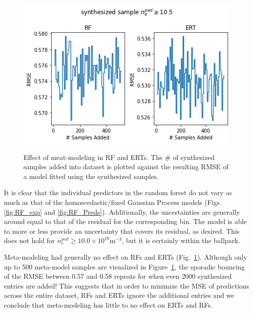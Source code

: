 \documentclass[a4paper, twoside, final, 12pt]{article}
\begin{document}
{\begin{figure}
		\centering
		\vspace{-18pt}
		\caption{Effect of meat-modeling in RF and ERTs. The \# of synthesized samples added into dataset is plotted against the resulting RMSE of a model fitted using the synthesized samples.}
		\includegraphics[width=\linewidth, keepaspectratio=true, trim=0 0 0 30, clip]{./src/ERT_vs_RF_meta_modeling}
		\vspace{-22pt}
		\label{fig:RF_meta_model}
\end{figure}
It is clear that the individual predictors in the random forest do not vary as much as that of the homoscedastic/fixed Gaussian Process models (Figs. \ref{fig:RF_exp} and \ref{fig:RF_Preds}).
Additionally, the uncertainties are generally around equal to that of the residual for the corresponding bin. The model is able to more or less provide an uncertainty that covers its residual, as desired. This does not hold for $n_e^{ped} \geq 10.0 \times 10^{19}\text{m}^{-3}$, but it is certainly within the ballpark. 

Meta-modeling had generally no effect on RFs and ERTs (Fig.~\ref{fig:RF_meta_model}).
Although only up to 500 meta-model samples are visualized in Figure~\ref{fig:RF_meta_model}, the sporadic bouncing of the RMSE between 0.57 and 0.58 repeats for when even 2000 synthesized entries are added!
This suggests that in order to minimize the MSE of predictions across the entire dataset, RFs and ERTs ignore the additional entries and we conclude that meta-modeling has little to no effect on ERTs and RFs.

}
\end{document}

